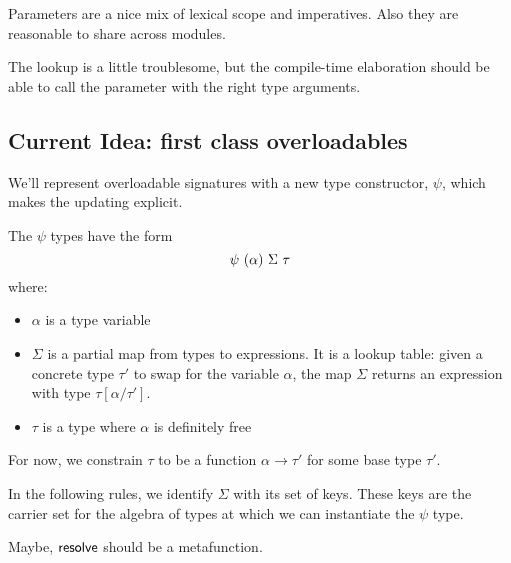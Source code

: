 \documentclass{article}
\begin{document}
Parameters are a nice mix of lexical scope and imperatives.
Also they are reasonable to share across modules.

The lookup is a little troublesome, but the compile-time elaboration should be able to call the parameter with the right type arguments.


\newpage
\subsection*{Current Idea: first class overloadables}
We'll represent overloadable signatures with a new type constructor, $\psi$, which makes the updating explicit.

The $\psi$ types have the form
$$\kpsi{\alpha}{\Sigma}{\tau}$$
where:
\begin{itemize}
\item $\alpha$ is a type variable
\item $\Sigma$ is a partial map from types to expressions.
  It is a lookup table: given a concrete type $\tau'$ to swap for the variable $\alpha$, the map $\Sigma$ returns an expression with type $\tau[\alpha/\tau']$.
\item $\tau$ is a type where $\alpha$ is definitely free
\end{itemize}

For now, we constrain $\tau$ to be a function $\alpha \rightarrow \tau'$ for some base type $\tau'$.

In the following rules, we identify $\Sigma$ with its set of keys.
These keys are the carrier set for the algebra of types at which we can instantiate the $\psi$ type.

\begin{mathpar}




\end{mathpar}
Maybe, $\kres$ should be a metafunction.
\end{document}
